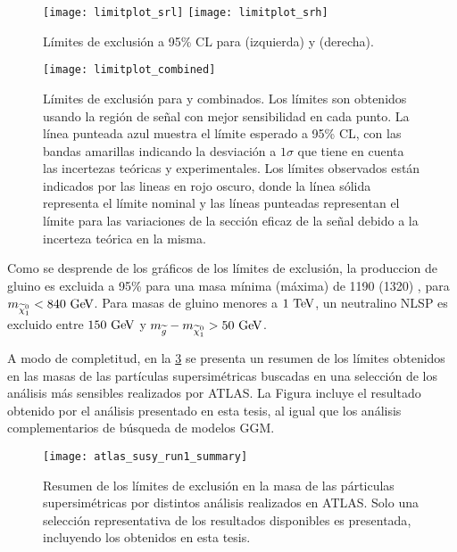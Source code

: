 \begin{figure}[!htb]
  \centering

  \texttt{[image: limitplot\_srl]}
  \texttt{[image: limitplot\_srh]}

  \caption{Límites de exclusión a 95\% CL para {\SRL}  (izquierda) y {\SRH} (derecha).}
  \label{fig:limit_srs}
\end{figure}


\begin{figure}[!htb]
  \centering

  \texttt{[image: limitplot\_combined]}

  \caption{Límites de exclusión para {\SRL} y {\SRH} combinados.
    Los límites son obtenidos usando la región de señal con mejor sensibilidad
    en cada punto.
    La línea punteada azul muestra el límite esperado a 95\% CL, con las bandas amarillas indicando la desviación a
    $1\sigma$ que tiene en cuenta las incertezas teóricas y experimentales. Los
    límites observados están indicados por las lineas en rojo oscuro, donde la línea
    sólida representa el límite nominal y las líneas punteadas representan el límite
    para las variaciones de la sección eficaz de la señal debido a la incerteza
    teórica en la misma.}
   \label{fig:limit_combined}

\end{figure}


Como se desprende de los gráficos de los límites de exclusión, la produccion de
gluino es excluida a 95\% {\cl} para una masa mínima (máxima) de 1190 (1320)
\gev, para $m_{\ninoone}<{840}\gev$. Para masas de gluino menores a $1\tev$, un
neutralino NLSP es excluido entre $150\gev$ y $m_{\gluino}-m_{\ninoone}>50\gev$.

A modo de completitud, en la \cref{fig:susy_summary} se presenta un resumen de los límites obtenidos en
las masas de las partículas supersimétricas buscadas en una selección de los
análisis más sensibles realizados por ATLAS. La Figura incluye el resultado obtenido
por el análisis presentado en esta tesis, al igual que los análisis
complementarios de búsqueda de modelos GGM. %


\begin{figure}[!htb]
  \centering

  \texttt{[image: atlas\_susy\_run1\_summary]}

  \caption{Resumen de los límites de exclusión en la masa de las párticulas
    supersimétricas por distintos análisis realizados en ATLAS. Solo una
    selección representativa de los resultados disponibles es
    presentada\cite{susy_summary}, incluyendo los obtenidos en esta tesis.}
  \label{fig:susy_summary}

\end{figure}



